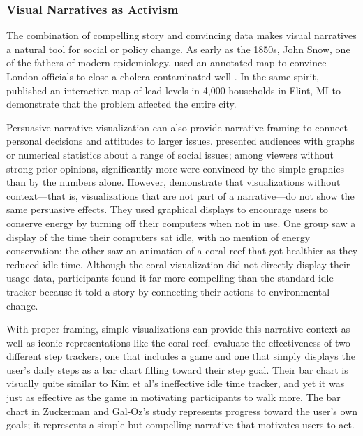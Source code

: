 \subsubsection{Visual Narratives as Activism}
The combination of compelling story and convincing data makes visual narratives a natural tool for social or policy change. As early as the 1850s, John Snow, one of the fathers of modern epidemiology, used an annotated map to convince London officials to close a cholera-contaminated well \citep{Johnson2006Ghost}. In the same spirit, \citet{MichiganPublicRadio2016MAP} published an interactive map of lead levels in 4,000 households in Flint, MI to demonstrate that the problem affected the entire city.

Persuasive narrative visualization can also provide narrative framing to connect personal decisions and attitudes to larger issues. \citet{PandeyEtAl2014Persuasive} presented audiences with graphs or numerical statistics about a range of social issues; among viewers without strong prior opinions, significantly more were convinced by the simple graphics than by the numbers alone. However, \citet{KimEtAl2010Designing} demonstrate that visualizations without context---that is, visualizations that are not part of a narrative---do not show the same persuasive effects. They used graphical displays to encourage users to conserve energy by turning off their computers when not in use. One group saw a display of the time their computers sat idle, with no mention of energy conservation; the other saw an animation of a coral reef that got healthier as they reduced idle time. Although the coral visualization did not directly display their usage data, participants found it far more compelling than the standard idle tracker because it told a story by connecting their actions to environmental change.

With proper framing, simple visualizations can provide this narrative context as well as iconic representations like the coral reef. \citet{ZuckermanGalOz2014Deconstructing} evaluate the effectiveness of two different step trackers, one that includes a game and one that simply displays the user's daily steps as a bar chart filling toward their step goal. Their bar chart is visually quite similar to Kim et al's ineffective idle time tracker, and yet it was just as effective as the game in motivating participants to walk more. The bar chart in Zuckerman and Gal-Oz's study represents progress toward the user's own goals; it represents a simple but compelling narrative that motivates users to act.
